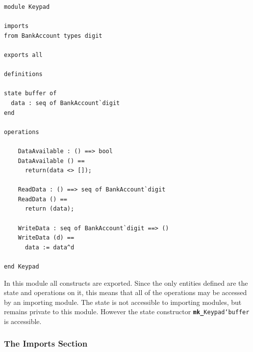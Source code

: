 \documentclass{overturerepchap}
\newcommand{\keyw}[1]{{\bf\ttfamily #1}}
\begin{document}
\begin{description}
\begin{lstlisting}
module Keypad

imports
from BankAccount types digit

exports all

definitions

state buffer of
  data : seq of BankAccount`digit
end

operations

    DataAvailable : () ==> bool
    DataAvailable () ==
      return(data <> []);

    ReadData : () ==> seq of BankAccount`digit
    ReadData () ==
      return (data);

    WriteData : seq of BankAccount`digit ==> ()
    WriteData (d) ==
      data := data^d

end Keypad
\end{lstlisting}
In this module all constructs are exported. Since the only entities
defined are the state and operations on it, this means that all of the
operations may be accessed by an importing module. The state is not
accessible to importing modules, but remains private to this
module. However the state constructor
\texttt{\keyw{mk\_}Keypad`buffer} is accessible.


\end{description}

\subsubsection{The Imports Section}
\end{document}
